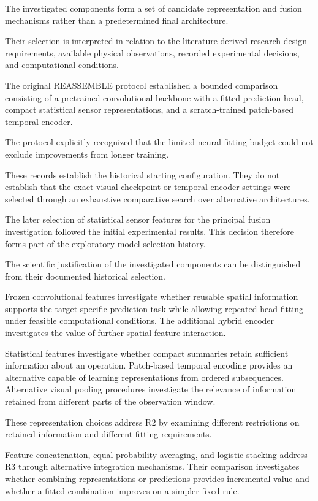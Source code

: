 The investigated components form a set of candidate representation and fusion mechanisms rather than a predetermined final architecture.

Their selection is interpreted in relation to the literature-derived research design requirements, available physical observations, recorded experimental decisions, and computational conditions.

The original REASSEMBLE protocol established a bounded comparison consisting of a pretrained convolutional backbone with a fitted prediction head, compact statistical sensor representations, and a scratch-trained patch-based temporal encoder.

The protocol explicitly recognized that the limited neural fitting budget could not exclude improvements from longer training.

These records establish the historical starting configuration. They do not establish that the exact visual checkpoint or temporal encoder settings were selected through an exhaustive comparative search over alternative architectures.

The later selection of statistical sensor features for the principal fusion investigation followed the initial experimental results. This decision therefore forms part of the exploratory model-selection history.

The scientific justification of the investigated components can be distinguished from their documented historical selection.

Frozen convolutional features investigate whether reusable spatial information supports the target-specific prediction task while allowing repeated head fitting under feasible computational conditions. The additional hybrid encoder investigates the value of further spatial feature interaction.

Statistical features investigate whether compact summaries retain sufficient information about an operation. Patch-based temporal encoding provides an alternative capable of learning representations from ordered subsequences. Alternative visual pooling procedures investigate the relevance of information retained from different parts of the observation window.

These representation choices address R2 by examining different restrictions on retained information and different fitting requirements.

Feature concatenation, equal probability averaging, and logistic stacking address R3 through alternative integration mechanisms. Their comparison investigates whether combining representations or predictions provides incremental value and whether a fitted combination improves on a simpler fixed rule.

